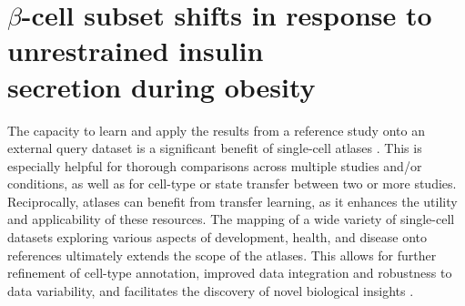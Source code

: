 \section[$\beta$-cell subset shifts in response to unrestrained insulin secretion during obesity]{$\beta$-cell subset shifts in response to unrestrained insulin\\secretion during obesity}
\label{sec:chp3_validation}


\par The capacity to learn and apply the results from a reference study onto an external query dataset is a significant benefit of single-cell atlases \textbf{\cite{lotfollahi_mapping_2021,lotfollahi_biologically_2023,ye_mapping_2024}}. This is especially helpful for thorough comparisons across multiple studies and/or conditions, as well as for cell-type or state transfer between two or more studies. Reciprocally, atlases can benefit from transfer learning, as it enhances the utility and applicability of these resources. The mapping of a wide variety of single-cell datasets exploring various aspects of development, health, and disease onto references ultimately extends the scope of the atlases. This allows for further refinement of cell-type annotation, improved data integration and robustness to data variability, and facilitates the discovery of novel biological insights \textbf{\cite{lotfollahi_future_2024}}.\\


